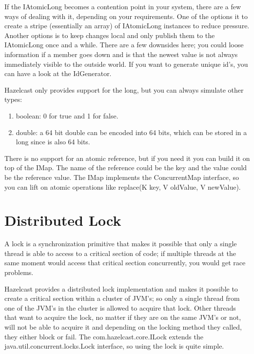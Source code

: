 If the IAtomicLong becomes a contention point in your system, there are a few ways of dealing with it, depending on your requirements. One of the options it to create a stripe (essentially an array) of IAtomicLong instances to reduce pressure. Another options is to keep changes local and only publish them to the IAtomicLong once and a while. There are a few downsides here; you could loose information if a member goes down and is that the newest value is not always immediately visible to the outside world. If you want to generate unique id's, you can have a look at the IdGenerator.

Hazelcast only provides support for the long, but you can always simulate other types:
\begin{enumerate}
\item boolean: 0 for true and 1 for false.
\item double: a 64 bit double can be encoded into 64 bits, which can be stored in a long since is also 64 bits.
\end{enumerate}
There is no support for an atomic reference, but if you need it you can build it on top of the IMap. The name of the reference could be the key and the value could be the reference value. The IMap implements the ConcurrentMap interface, so you can lift on atomic operations like replace(K key, V oldValue, V newValue). 

\section{Distributed Lock}
A lock is a synchronization primitive that makes it possible that only a single thread is able to access to a critical section of code; if multiple threads at the same moment would access that critical section concurrently, you would get race problems. 

Hazelcast provides a distributed lock implementation and makes it possible to create a critical section within a cluster of JVM's; so only a single thread from one of the JVM's in the cluster is allowed to acquire that lock. Other threads that want to acquire the lock, no matter if they are on the same JVM's or not, will not be able to acquire it and depending on the locking method they called, they either block or fail. The com.hazelcast.core.ILock extends the java.util.concurrent.locks.Lock interface, so using the lock is quite simple.


